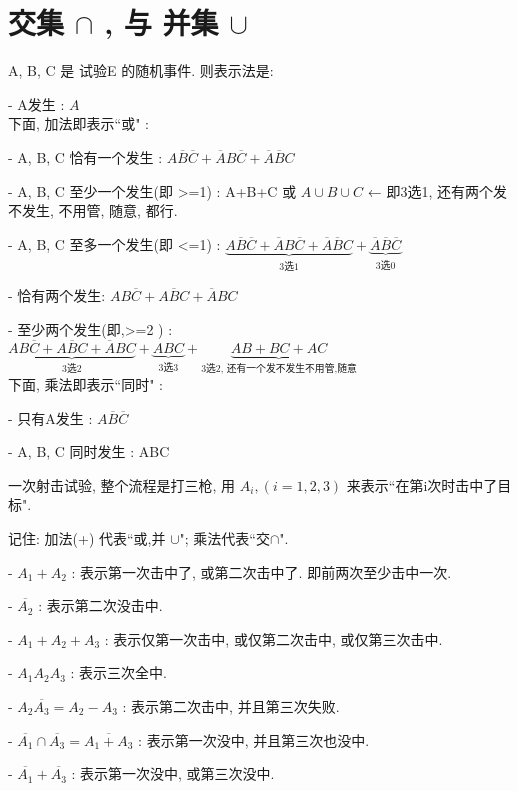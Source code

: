 \documentclass[UTF8]{ctexart}
\begin{document}
	
	

	
	\section{交集 $\cap$ , 与 并集 $\cup$}
	
	A, B, C 是 试验E 的随机事件. 则表示法是:
	
	- A发生 : $A$ \\
	
	下面, 加法即表示``或" :
	
	- A, B, C 恰有一个发生 : $A\overline{B}\overline{C}+\overline{A}B\overline{C}+\overline{A}\overline{B}C$
	
	- A, B, C 至少一个发生(即 >=1) : A+B+C 或 $A{\cup}B{\cup}C$ ← 即3选1, 还有两个发不发生, 不用管, 随意, 都行.
	
	- A, B, C 至多一个发生(即 <=1) : $\underset{3\text{选}1}{\underbrace{A\overline{B}\overline{C}+\overline{A}B\overline{C}+\overline{A}\overline{B}C}}+\underset{3\text{选}0}{\underbrace{\overline{A}\overline{B}\overline{C}}}		$
		
	- 恰有两个发生: $AB \overline{C} + A \overline{B} C + \overline{A} BC $
	
	- 至少两个发生(即,>=2 ) : $\underset{3\text{选}2}{\underbrace{AB\overline{C}+A\overline{B}C+\overline{A}BC}}+\underset{3\text{选}3}{\underbrace{ABC}}+\underset{3\text{选2,\ 还有一个发不发生不用管,随意}}{\underbrace{AB+BC+AC}}	$	\\
		
		

	下面, 乘法即表示``同时" :	
	
	- 只有A发生 : $A\overline{B}\overline{C}$	

	- A, B, C 同时发生 : ABC  \\
	
\begin{myEnvSample}
	一次射击试验, 整个流程是打三枪, 用 $A_i, (i=1,2,3)$ 来表示``在第i次时击中了目标".
	
	记住: 加法(+) 代表``或,并 $\cup$"; 乘法代表``交$\cap$".
	
	- $A_1+A_2$ : 表示第一次击中了, 或第二次击中了. 即前两次至少击中一次.
	
	- $	\overline{A_2}	$ : 表示第二次没击中.
	
	- $	A_1+A_2+A_3	$ : 表示仅第一次击中, 或仅第二次击中, 或仅第三次击中.
	
	- $	A_1A_2A_3	$ : 表示三次全中.
	
	- $	A_2\overline{A_3} = A_2 - A_3	$ : 表示第二次击中, 并且第三次失败.
	
	- $	\overline{A_1}\cap \overline{A_3}=\overline{A_1+A_3}$ : 表示第一次没中, 并且第三次也没中.
	
	- $	\overline{A_1}+\overline{A_3}	$ : 表示第一次没中, 或第三次没中.


\end{myEnvSample}
\end{document}
